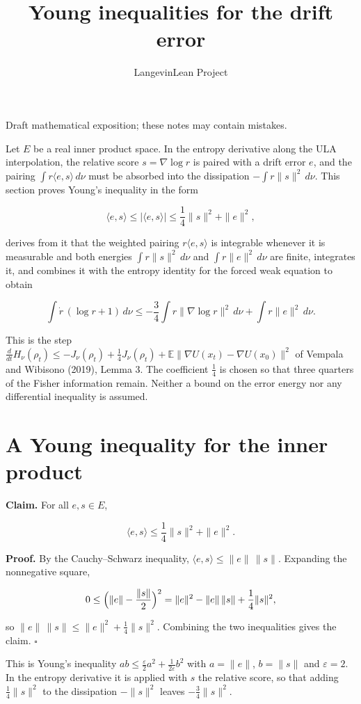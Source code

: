 \documentclass[11pt,a4paper]{article}
\title{\texorpdfstring{Young inequalities for the drift error}{Young inequalities for the drift error}}
\author{LangevinLean Project}
\date{}
\begin{document}
\maketitle
Draft mathematical exposition; these notes may contain mistakes.


Let \(E\) be a real inner product space. In the entropy derivative along the ULA interpolation, the relative score \(s=\nabla\log r\) is paired with a drift error \(e\), and the pairing \(\int r\langle e,s\rangle\,d\nu\) must be absorbed into the dissipation \(-\int r\|s\|^2\,d\nu\). This section proves Young's inequality in the form


\[\langle e,s\rangle\le|\langle e,s\rangle|\le\frac14\|s\|^2+\|e\|^2,\]


derives from it that the weighted pairing \(r\langle e,s\rangle\) is integrable whenever it is measurable and both energies \(\int r\|s\|^2\,d\nu\) and \(\int r\|e\|^2\,d\nu\) are finite, integrates it, and combines it with the entropy identity for the forced weak equation to obtain


\[\int\dot r\,(\log r+1)\,d\nu\le-\frac34\int r\|\nabla\log r\|^2\,d\nu+\int r\|e\|^2\,d\nu.\]


This is the step \(\frac{d}{dt}H_\nu(\rho_t)\le-J_\nu(\rho_t)+\frac14J_\nu(\rho_t)+\mathbb E\|\nabla U(x_t)-\nabla U(x_0)\|^2\) of Vempala and Wibisono (2019), Lemma 3. The coefficient \(\frac14\) is chosen so that three quarters of the Fisher information remain. Neither a bound on the error energy nor any differential inequality is assumed.


\section{\texorpdfstring{A Young inequality for the inner product}{A Young inequality for the inner product}}


\textbf{Claim.} For all \(e,s\in E\),


\[\langle e,s\rangle\le\frac14\|s\|^2+\|e\|^2.\]


\textbf{Proof.} By the Cauchy–Schwarz inequality, \(\langle e,s\rangle\le\|e\|\,\|s\|\). Expanding the nonnegative square,


\[0\le\Bigl(\|e\|-\frac{\|s\|}2\Bigr)^2=\|e\|^2-\|e\|\,\|s\|+\frac14\|s\|^2,\]


so \(\|e\|\,\|s\|\le\|e\|^2+\frac14\|s\|^2\). Combining the two inequalities gives the claim. \(\square\)




This is Young's inequality \(ab\le\frac{\varepsilon}{2}a^2+\frac1{2\varepsilon}b^2\) with \(a=\|e\|\), \(b=\|s\|\) and \(\varepsilon=2\). In the entropy derivative it is applied with \(s\) the relative score, so that adding \(\frac14\|s\|^2\) to the dissipation \(-\|s\|^2\) leaves \(-\frac34\|s\|^2\).
\end{document}

